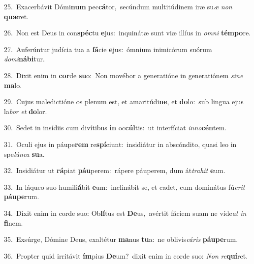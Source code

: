 {\numbfont\textcolor{\numbcolor}{25.}}~Exacerbávit Dómi\textbf{num} pec\-\textbf{cá}\-tor,~\star secúndum multitúdinem iræ su\textit{æ} \textit{non} \textbf{quæ}\-ret.\par
{\numbfont\textcolor{\numbcolor}{26.}}~Non est Deus in con\-\textbf{spéc}\-tu \textbf{e}\-jus:~\star inquinátæ sunt viæ illíus in \textit{om}\-\textit{ni} \textbf{tém}\-\textbf{po}re.\par
{\numbfont\textcolor{\numbcolor}{27.}}~Auferúntur judícia tua a \textbf{fá}\-cie \textbf{e}\-jus:~\star ómnium inimicórum suórum \textit{do}\-\textit{mi}\textbf{ná}\textbf{bi}tur.\par
{\numbfont\textcolor{\numbcolor}{28.}}~Dixit enim in \textbf{cor}\-de \textbf{su}\-o:~\star Non movébor a generatióne in generatiónem \textit{si}\-\textit{ne} \textbf{ma}\-lo.\par
{\numbfont\textcolor{\numbcolor}{29.}}~Cujus maledictióne os plenum est, et amaritúdi\-\textbf{ne}\-, et \textbf{do}\-lo:~\star sub lingua ejus la\textit{bor} \textit{et} \textbf{do}\-lor.\par
{\numbfont\textcolor{\numbcolor}{30.}}~Sedet in insídiis cum divítibus \textbf{in} oc\-\textbf{cúl}\-tis:~\star ut interfíciat \textit{in}\-\textit{no}\textbf{cén}tem.\par
{\numbfont\textcolor{\numbcolor}{31.}}~Oculi ejus in páupe\textbf{rem} re\-\textbf{spí}\-ciunt:~\star insidiátur in abscóndito, quasi leo in spe\-\textit{lún}\-\textit{ca} \textbf{su}\-a.\par
{\numbfont\textcolor{\numbcolor}{32.}}~Insidiátur ut \textbf{rá}\-piat \textbf{páu}\-perem:~\star rápere páuperem, dum át\-\textit{tra}\-\textit{hit} \textbf{e}\-um.\par
{\numbfont\textcolor{\numbcolor}{33.}}~In láqueo suo humili\-\textbf{á}\-bit \textbf{e}\-um:~\star inclinábit se, et cadet, cum dominátus fú\-\textit{e}\-\textit{rit} \textbf{páu}\-\textbf{pe}rum.\par
{\numbfont\textcolor{\numbcolor}{34.}}~Dixit enim in corde suo: Ob\-\textbf{lí}\-tus est \textbf{De}\-us,~\star avértit fáciem suam ne víde\textit{at} \textit{in} \textbf{fi}\-nem.\par
{\numbfont\textcolor{\numbcolor}{35.}}~Exsúrge, Dómine Deus, exaltétur \textbf{ma}\-nus \textbf{tu}\-a:~\star ne oblivis\-\textit{cá}\-\textit{ris} \textbf{páu}\-\textbf{pe}rum.\par
{\numbfont\textcolor{\numbcolor}{36.}}~Propter quid irritávit \textbf{ím}\-pius \textbf{De}\-um?~\star dixit enim in corde suo: \textit{Non} \textit{re}\-\textbf{quí}ret.\par
